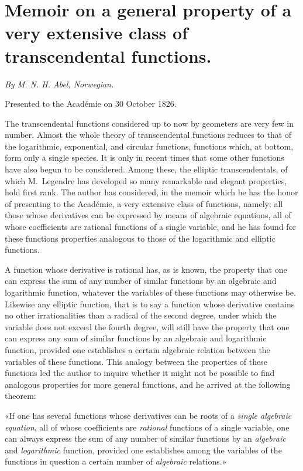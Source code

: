 \documentclass{article}
\begin{document}
\section*{Memoir on a general property of a very extensive class of transcendental functions.}

\emph{By M. N. H. Abel, Norwegian.}

Presented to the Académie on 30 October 1826.

The transcendental functions considered up to now by geometers are very few in number. Almost the whole theory of transcendental functions reduces to that of the logarithmic, exponential, and circular functions, functions which, at bottom, form only a single species. It is only in recent times that some other functions have also begun to be considered. Among these, the elliptic transcendentals, of which M.~Legendre has developed so many remarkable and elegant properties, hold first rank. The author has considered, in the memoir which he has the honor of presenting to the Académie, a very extensive class of functions, namely: all those whose derivatives can be expressed by means of algebraic equations, all of whose coefficients are rational functions of a single
variable, and he has found for these functions properties analogous to those of the logarithmic and elliptic functions.

A function whose derivative is rational has, as is known, the property that one can express the sum of any number of similar functions by an algebraic and logarithmic function, whatever the variables of these functions may otherwise be. Likewise any elliptic function, that is to say a function whose derivative contains no other irrationalities than a radical of the second degree, under which the variable does not exceed the fourth degree, will still have the property that one can express any sum of similar functions by an algebraic and logarithmic function, provided one establishes a certain algebraic relation between the variables of these functions. This analogy between the properties of these functions led the author to inquire whether it might not be possible to find analogous properties for more general functions, and he arrived at the following theorem:

«If one has several functions whose derivatives can be roots of a \emph{single algebraic equation}, all of whose coefficients are \emph{rational} functions of a single variable, one can always express the sum of any number of similar functions by an \emph{algebraic} and \emph{logarithmic} function, provided one establishes among the variables of the functions in question a certain number of \emph{algebraic} relations.»
\end{document}
